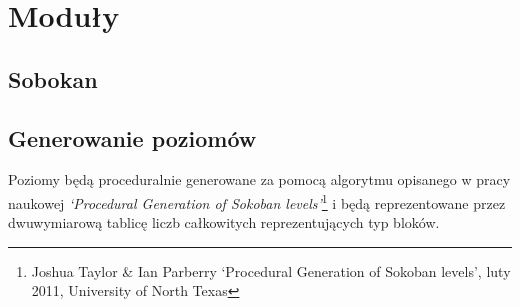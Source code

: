 \documentclass[9pt]{article}
\begin{document}
\section{Moduły}

\subsection{Sobokan}

\subsection{Generowanie poziomów}
Poziomy będą proceduralnie generowane za pomocą algorytmu opisanego w pracy
naukowej \textit{`Procedural Generation of Sokoban levels'}\footnote{Joshua Taylor 
\& Ian Parberry `Procedural Generation of Sokoban levels', luty 2011, University 
of North Texas} i będą reprezentowane przez dwuwymiarową tablicę liczb całkowitych
reprezentujących typ bloków.



\end{document}
